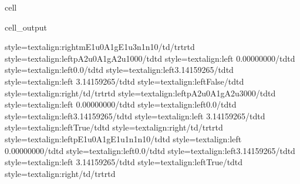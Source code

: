 \documentclass[letterpaper,table,10pt,english]{jupyterBook}
\begin{document}
\begin{sphinxuseclass}{cell}
\begin{sphinxVerbatimOutput}
\begin{sphinxuseclass}{cell_output}
\begin{sphinxVerbatim}[commandchars=\\\{\}]
style=\PYGZbs{}\PYGZsq{}text\PYGZhy{}align:right\PYGZbs{}\PYGZsq{}\PYGZgt{}m\PYGZus{}E1u\PYGZus{}0\PYGZus{}A1g\PYGZus{}E1u\PYGZus{}3\PYGZus{}n1\PYGZus{}n1\PYGZus{}0\PYGZlt{}/td\PYGZgt{}\PYGZlt{}/tr\PYGZgt{}\PYGZlt{}tr\PYGZgt{}\PYGZlt{}td style=\PYGZbs{}\PYGZsq{}text\PYGZhy{}align:left\PYGZbs{}\PYGZsq{}\PYGZgt{}p\PYGZus{}A2u\PYGZus{}0\PYGZus{}A1g\PYGZus{}A2u\PYGZus{}1\PYGZus{}0\PYGZus{}0\PYGZus{}0\PYGZlt{}/td\PYGZgt{}\PYGZlt{}td style=\PYGZbs{}\PYGZsq{}text\PYGZhy{}align:left\PYGZbs{}\PYGZsq{}\PYGZgt{} 0.00000000\PYGZlt{}/td\PYGZgt{}\PYGZlt{}td style=\PYGZbs{}\PYGZsq{}text\PYGZhy{}align:left\PYGZbs{}\PYGZsq{}\PYGZgt{}0.0\PYGZlt{}/td\PYGZgt{}\PYGZlt{}td style=\PYGZbs{}\PYGZsq{}text\PYGZhy{}align:left\PYGZbs{}\PYGZsq{}\PYGZgt{}\PYGZhy{}3.14159265\PYGZlt{}/td\PYGZgt{}\PYGZlt{}td style=\PYGZbs{}\PYGZsq{}text\PYGZhy{}align:left\PYGZbs{}\PYGZsq{}\PYGZgt{} 3.14159265\PYGZlt{}/td\PYGZgt{}\PYGZlt{}td style=\PYGZbs{}\PYGZsq{}text\PYGZhy{}align:left\PYGZbs{}\PYGZsq{}\PYGZgt{}False\PYGZlt{}/td\PYGZgt{}\PYGZlt{}td style=\PYGZbs{}\PYGZsq{}text\PYGZhy{}align:right\PYGZbs{}\PYGZsq{}\PYGZgt{}\PYGZlt{}/td\PYGZgt{}\PYGZlt{}/tr\PYGZgt{}\PYGZlt{}tr\PYGZgt{}\PYGZlt{}td style=\PYGZbs{}\PYGZsq{}text\PYGZhy{}align:left\PYGZbs{}\PYGZsq{}\PYGZgt{}p\PYGZus{}A2u\PYGZus{}0\PYGZus{}A1g\PYGZus{}A2u\PYGZus{}3\PYGZus{}0\PYGZus{}0\PYGZus{}0\PYGZlt{}/td\PYGZgt{}\PYGZlt{}td style=\PYGZbs{}\PYGZsq{}text\PYGZhy{}align:left\PYGZbs{}\PYGZsq{}\PYGZgt{} 0.00000000\PYGZlt{}/td\PYGZgt{}\PYGZlt{}td style=\PYGZbs{}\PYGZsq{}text\PYGZhy{}align:left\PYGZbs{}\PYGZsq{}\PYGZgt{}0.0\PYGZlt{}/td\PYGZgt{}\PYGZlt{}td style=\PYGZbs{}\PYGZsq{}text\PYGZhy{}align:left\PYGZbs{}\PYGZsq{}\PYGZgt{}\PYGZhy{}3.14159265\PYGZlt{}/td\PYGZgt{}\PYGZlt{}td style=\PYGZbs{}\PYGZsq{}text\PYGZhy{}align:left\PYGZbs{}\PYGZsq{}\PYGZgt{} 3.14159265\PYGZlt{}/td\PYGZgt{}\PYGZlt{}td style=\PYGZbs{}\PYGZsq{}text\PYGZhy{}align:left\PYGZbs{}\PYGZsq{}\PYGZgt{}True\PYGZlt{}/td\PYGZgt{}\PYGZlt{}td style=\PYGZbs{}\PYGZsq{}text\PYGZhy{}align:right\PYGZbs{}\PYGZsq{}\PYGZgt{}\PYGZlt{}/td\PYGZgt{}\PYGZlt{}/tr\PYGZgt{}\PYGZlt{}tr\PYGZgt{}\PYGZlt{}td style=\PYGZbs{}\PYGZsq{}text\PYGZhy{}align:left\PYGZbs{}\PYGZsq{}\PYGZgt{}p\PYGZus{}E1u\PYGZus{}0\PYGZus{}A1g\PYGZus{}E1u\PYGZus{}1\PYGZus{}n1\PYGZus{}n1\PYGZus{}0\PYGZlt{}/td\PYGZgt{}\PYGZlt{}td style=\PYGZbs{}\PYGZsq{}text\PYGZhy{}align:left\PYGZbs{}\PYGZsq{}\PYGZgt{} 0.00000000\PYGZlt{}/td\PYGZgt{}\PYGZlt{}td style=\PYGZbs{}\PYGZsq{}text\PYGZhy{}align:left\PYGZbs{}\PYGZsq{}\PYGZgt{}0.0\PYGZlt{}/td\PYGZgt{}\PYGZlt{}td style=\PYGZbs{}\PYGZsq{}text\PYGZhy{}align:left\PYGZbs{}\PYGZsq{}\PYGZgt{}\PYGZhy{}3.14159265\PYGZlt{}/td\PYGZgt{}\PYGZlt{}td style=\PYGZbs{}\PYGZsq{}text\PYGZhy{}align:left\PYGZbs{}\PYGZsq{}\PYGZgt{} 3.14159265\PYGZlt{}/td\PYGZgt{}\PYGZlt{}td style=\PYGZbs{}\PYGZsq{}text\PYGZhy{}align:left\PYGZbs{}\PYGZsq{}\PYGZgt{}True\PYGZlt{}/td\PYGZgt{}\PYGZlt{}td style=\PYGZbs{}\PYGZsq{}text\PYGZhy{}align:right\PYGZbs{}\PYGZsq{}\PYGZgt{}\PYGZlt{}/td\PYGZgt{}\PYGZlt{}/tr\PYGZgt{}\PYGZlt{}tr\PYGZgt{}\PYGZlt{}td 
\end{sphinxVerbatim}
\end{sphinxuseclass}
\end{sphinxVerbatimOutput}
\end{sphinxuseclass}
\end{document}
